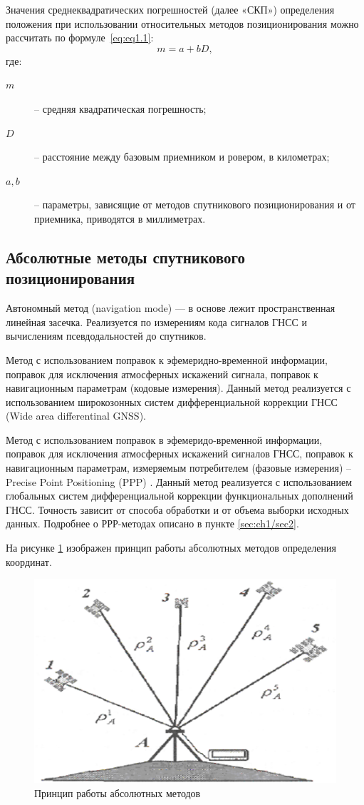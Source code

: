Значения среднеквадратических погрешностей (далее «СКП») определения положения при использовании относительных методов позиционирования можно рассчитать по формуле~\cref{eq:eq1.1}:
\begin{equation}
	\label{eq:eq1.1}
	m=a+bD,
\end{equation}
где: 
\begin{description}
	\item[$m$] -- средняя квадратическая погрешность;
	\item[$D$] -- расстояние между базовым приемником и ровером, в километрах; 
	\item[$a, b$] -- параметры, зависящие от методов спутникового позиционирования и от приемника, приводятся в миллиметрах.
\end{description}



\subsection{Абсолютные методы спутникового позиционирования}\label{subsec:ch1/sec1/sub2}

Автономный метод (navigation mode) --- в основе лежит пространственная линейная засечка. Реализуется по измерениям кода сигналов ГНСС и вычислениям псевдодальностей до спутников.

Метод с использованием поправок к эфемеридно-временной информации, поправок для исключения атмосферных искажений сигнала, поправок к навигационным параметрам (кодовые измерения). Данный метод реализуется с использованием широкозонных систем дифференциальной коррекции ГНСС (Wide area differentinal GNSS).

Метод с использованием поправок в эфемеридо-временной информации, поправок для исключения атмосферных искажений сигналов ГНСС, поправок к навигационным параметрам, измеряемым потребителем (фазовые измерения) – Precise Point Positioning (PPP) \cite{src04, src42, src50}. Данный метод реализуется с использованием глобальных систем дифференциальной коррекции функциональных дополнений ГНСС. Точность зависит от способа обработки и от объема выборки исходных данных. Подробнее о РРР-методах описано в пункте \cref{sec:ch1/sec2}.

На рисунке \cref{fig:pic02} изображен принцип работы абсолютных методов определения координат.
\begin{figure}[h]
	\centering
	\includegraphics[width=0.7\linewidth]{images/pic02}
	\caption{Принцип работы абсолютных методов}
	\label{fig:pic02}
\end{figure}

